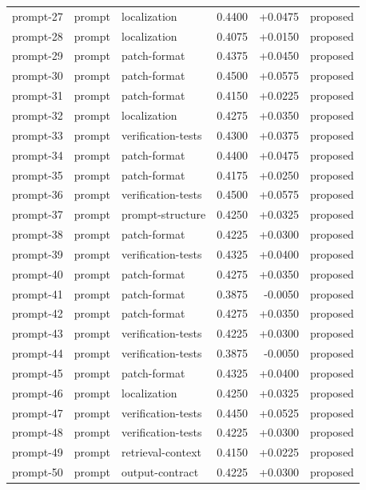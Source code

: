 \begin{center}
\begin{longtable}{llp{5.2cm}rrl}
prompt-27 & prompt & localization & 0.4400 & +0.0475 & proposed \\
prompt-28 & prompt & localization & 0.4075 & +0.0150 & proposed \\
prompt-29 & prompt & patch-format & 0.4375 & +0.0450 & proposed \\
prompt-30 & prompt & patch-format & 0.4500 & +0.0575 & proposed \\
prompt-31 & prompt & patch-format & 0.4150 & +0.0225 & proposed \\
prompt-32 & prompt & localization & 0.4275 & +0.0350 & proposed \\
prompt-33 & prompt & verification-tests & 0.4300 & +0.0375 & proposed \\
prompt-34 & prompt & patch-format & 0.4400 & +0.0475 & proposed \\
prompt-35 & prompt & patch-format & 0.4175 & +0.0250 & proposed \\
prompt-36 & prompt & verification-tests & 0.4500 & +0.0575 & proposed \\
prompt-37 & prompt & prompt-structure & 0.4250 & +0.0325 & proposed \\
prompt-38 & prompt & patch-format & 0.4225 & +0.0300 & proposed \\
prompt-39 & prompt & verification-tests & 0.4325 & +0.0400 & proposed \\
prompt-40 & prompt & patch-format & 0.4275 & +0.0350 & proposed \\
prompt-41 & prompt & patch-format & 0.3875 & -0.0050 & proposed \\
prompt-42 & prompt & patch-format & 0.4275 & +0.0350 & proposed \\
prompt-43 & prompt & verification-tests & 0.4225 & +0.0300 & proposed \\
prompt-44 & prompt & verification-tests & 0.3875 & -0.0050 & proposed \\
prompt-45 & prompt & patch-format & 0.4325 & +0.0400 & proposed \\
prompt-46 & prompt & localization & 0.4250 & +0.0325 & proposed \\
prompt-47 & prompt & verification-tests & 0.4450 & +0.0525 & proposed \\
prompt-48 & prompt & verification-tests & 0.4225 & +0.0300 & proposed \\
prompt-49 & prompt & retrieval-context & 0.4150 & +0.0225 & proposed \\
prompt-50 & prompt & output-contract & 0.4225 & +0.0300 & proposed \\

\end{longtable}
\end{center}
